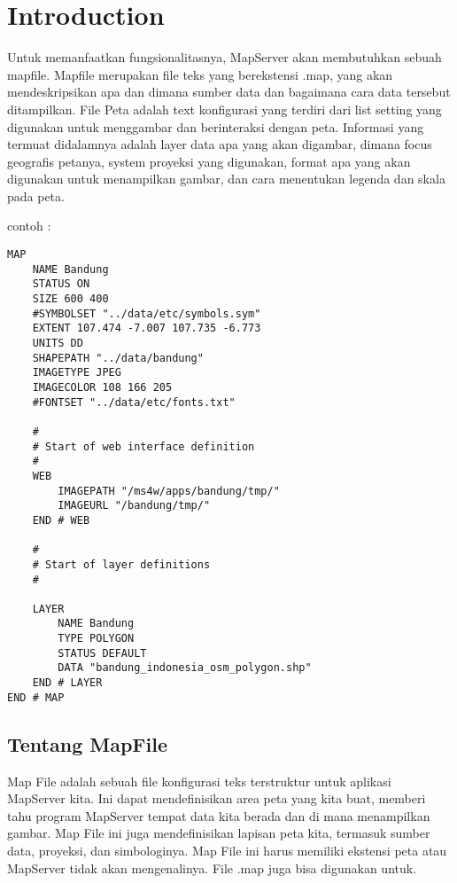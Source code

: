 

\section{Introduction}

Untuk memanfaatkan fungsionalitasnya, MapServer akan membutuhkan sebuah mapfile. Mapfile merupakan file teks yang berekstensi .map,
yang akan mendeskripsikan apa dan dimana sumber data dan bagaimana cara data tersebut ditampilkan. 
File Peta adalah text konfigurasi yang terdiri dari list setting yang digunakan untuk menggambar dan berinteraksi dengan peta. 
Informasi yang termuat didalamnya adalah layer data apa yang akan digambar, dimana focus geografis petanya, 
system proyeksi yang digunakan, format apa yang akan digunakan untuk menampilkan gambar, dan cara menentukan legenda dan skala pada peta.

contoh :
\begin{verbatim}
MAP
    NAME Bandung
    STATUS ON
    SIZE 600 400
    #SYMBOLSET "../data/etc/symbols.sym"
    EXTENT 107.474 -7.007 107.735 -6.773
    UNITS DD
    SHAPEPATH "../data/bandung"
	IMAGETYPE JPEG
    IMAGECOLOR 108 166 205
    #FONTSET "../data/etc/fonts.txt"

    #
    # Start of web interface definition
    #
    WEB
		IMAGEPATH "/ms4w/apps/bandung/tmp/" 
		IMAGEURL "/bandung/tmp/"
    END # WEB

    #
    # Start of layer definitions
    #
	
    LAYER
        NAME Bandung
        TYPE POLYGON
        STATUS DEFAULT
        DATA "bandung_indonesia_osm_polygon.shp"
    END # LAYER
END # MAP
\end{verbatim}

\subsection{Tentang MapFile}
Map File adalah sebuah file konfigurasi teks terstruktur untuk aplikasi MapServer kita. Ini dapat mendefinisikan area peta yang kita buat, 
memberi tahu program MapServer tempat data kita berada dan di mana menampilkan gambar. 
Map File ini juga mendefinisikan lapisan peta kita, termasuk sumber data, proyeksi, dan simbologinya. 
Map File ini harus memiliki ekstensi peta atau MapServer tidak akan mengenalinya.
File .map juga bisa digunakan untuk.

